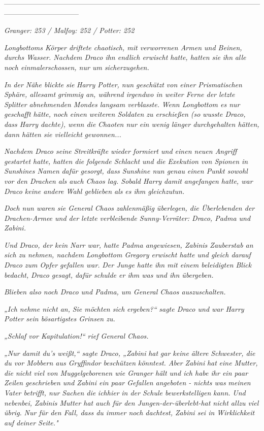 {--------------------------------------------------------------------------------------------------------------------------------------------

\hfill\break \emph{Granger: 253 / Malfoy: 252 / Potter: 252}

\emph{Longbottoms Körper driftete chaotisch, mit verworrenen Armen und Beinen, durchs Wasser. Nachdem Draco ihn endlich erwischt hatte, hatten sie} \emph{ihn} \emph{alle} \emph{\emph{noch einmal}erschossen, nur um sicherzugehen.}

\emph{In der Nähe blickte} \emph{sie} \emph{Harry Potter, nun geschützt von einer Prismatischen Sphäre, allesamt} \emph{grimmig an, während irgendwo in weiter Ferne der letzte Splitter abnehmenden Mondes langsam verblasste.} \emph{Wenn Longbottom es nur geschafft hätte, noch einen weiteren Soldaten zu erschießen (so} \emph{wusste Draco, dass Harry dachte), wenn die} \emph{Chaoten nur ein wenig länger durchgehalten hätten, dann hätten sie vielleicht} \emph{\emph{gewonnen...}}

\emph{Nachdem Draco seine Streitkräfte wieder formiert und einen neuen Angriff gestartet hatte, hatten die folgende Schlacht und die Exekution von Spionen in} \emph{Sunshines Namen} \emph{dafür gesorgt, dass Sunshine nun genau} \emph{einen Punkt sowohl vor den Drachen als auch Chaos lag. Sobald Harry damit angefangen hatte, war Draco keine andere Wahl geblieben als} \emph{es ihm gleichzutun.}

\emph{Doch nun waren sie General Chaos zahlenmäßig überlegen, die Überlebenden der Drachen-Armee und der letzte verbleibende Sunny-Verräter: Draco, Padma und Zabini.}

\emph{Und Draco, der kein Narr war, hatte Padma angewiesen, Zabinis Zauberstab an sich zu nehmen, nachdem Longbottom Gregory erwischt hatte und gleich darauf Draco zum Opfer gefallen war.} \emph{Der Junge hatte ihn mit einem beleidigten Blick bedacht,} \emph{Draco gesagt, dafür schulde er ihm was und ihn übergeben.}

\emph{Blieben also noch Draco und Padma, um General Chaos auszuschalten.}

\emph{„Ich nehme nicht an,} \emph{Sie möchten sich} \emph{ergeben?“} \emph{sagte Draco und war Harry Potter sein bösartigstes Grinsen zu.}

\emph{„Schlaf vor Kapitulation!“ rief General Chaos.}

\emph{„Nur damit du's weißt,“ sagte Draco, „Zabini} \emph{\emph{hat}} \emph{gar keine ältere Schwester, die du vor Mobbern aus Gryffindor} \emph{beschützen} \emph{könntest. Aber Zabini} \emph{\emph{hat}} \emph{eine Mutter, die nicht viel von Muggelgeborenen wie Granger hält und ich habe ihr ein paar} \emph{Zeilen} \emph{geschrieben und Zabini ein paar Gefallen angeboten - nichts was} \emph{meinen Vater betrifft, nur Sachen die} \emph{\emph{ich}hier} \emph{in der Schule bewerkstelligen} \emph{kann.} \emph{Und nebenbei, Zabinis Mutter hat auch für den Jungen-der-überlebt-hat nicht allzu viel übrig.} \emph{Nur für den Fall, dass du immer noch dachtest, Zabini sei in Wirklichkeit auf deiner Seite."}

}
